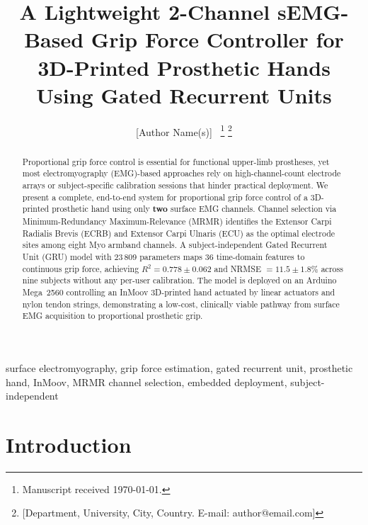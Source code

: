 \documentclass[journal]{IEEEtran}
\begin{document}
\title{A Lightweight 2-Channel sEMG-Based Grip Force Controller for
       3D-Printed Prosthetic Hands Using Gated Recurrent Units}

\author{[Author Name(s)]~
\thanks{Manuscript received \today.}
\thanks{[Department, University, City, Country. E-mail: author@email.com]}}

\maketitle

\begin{abstract}
Proportional grip force control is essential for functional upper-limb
prostheses, yet most electromyography (EMG)-based approaches rely on
high-channel-count electrode arrays or subject-specific calibration sessions
that hinder practical deployment.  We present a complete, end-to-end system
for proportional grip force control of a 3D-printed prosthetic hand using
only \textbf{two} surface EMG channels.  Channel selection via
Minimum-Redundancy Maximum-Relevance (MRMR) identifies the Extensor Carpi
Radialis Brevis (ECRB) and Extensor Carpi Ulnaris (ECU) as the optimal
electrode sites among eight Myo armband channels.  A subject-independent
Gated Recurrent Unit (GRU) model with 23\,809 parameters maps 36
time-domain features to continuous grip force, achieving $R^2 = 0.778 \pm
0.062$ and NRMSE $= 11.5 \pm 1.8\%$ across nine subjects without any
per-user calibration.  The model is deployed on an Arduino Mega~2560
controlling an InMoov 3D-printed hand actuated by linear actuators and
nylon tendon strings, demonstrating a low-cost, clinically viable pathway
from surface EMG acquisition to proportional prosthetic grip.
\end{abstract}

\begin{IEEEkeywords}
surface electromyography, grip force estimation, gated recurrent unit,
prosthetic hand, InMoov, MRMR channel selection, embedded deployment,
subject-independent
\end{IEEEkeywords}

\section{Introduction}
\label{sec:intro}
\end{document}
